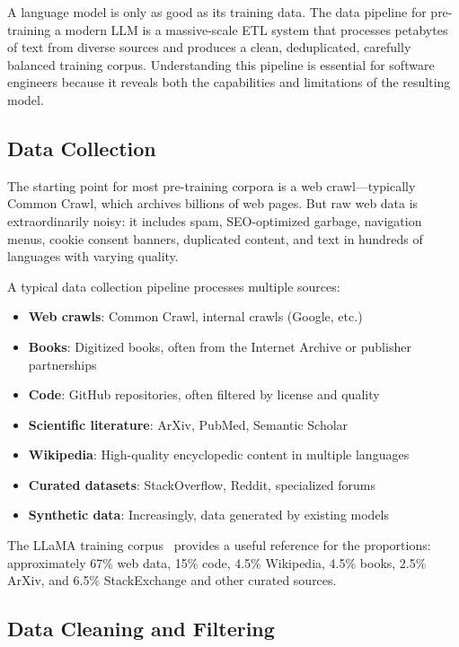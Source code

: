 A language model is only as good as its training data. The data pipeline for pre-training a modern LLM is a massive-scale ETL system that processes petabytes of text from diverse sources and produces a clean, deduplicated, carefully balanced training corpus. Understanding this pipeline is essential for software engineers because it reveals both the capabilities and limitations of the resulting model.

\subsection{Data Collection}

The starting point for most pre-training corpora is a web crawl---typically Common Crawl, which archives billions of web pages. But raw web data is extraordinarily noisy: it includes spam, SEO-optimized garbage, navigation menus, cookie consent banners, duplicated content, and text in hundreds of languages with varying quality.

A typical data collection pipeline processes multiple sources:

\begin{itemize}[leftmargin=*]
    \item \textbf{Web crawls}: Common Crawl, internal crawls (Google, etc.)
    \item \textbf{Books}: Digitized books, often from the Internet Archive or publisher partnerships
    \item \textbf{Code}: GitHub repositories, often filtered by license and quality
    \item \textbf{Scientific literature}: ArXiv, PubMed, Semantic Scholar
    \item \textbf{Wikipedia}: High-quality encyclopedic content in multiple languages
    \item \textbf{Curated datasets}: StackOverflow, Reddit, specialized forums
    \item \textbf{Synthetic data}: Increasingly, data generated by existing models
\end{itemize}

The LLaMA training corpus~\cite{touvron2023llama} provides a useful reference for the proportions: approximately 67\% web data, 15\% code, 4.5\% Wikipedia, 4.5\% books, 2.5\% ArXiv, and 6.5\% StackExchange and other curated sources.

\subsection{Data Cleaning and Filtering}

